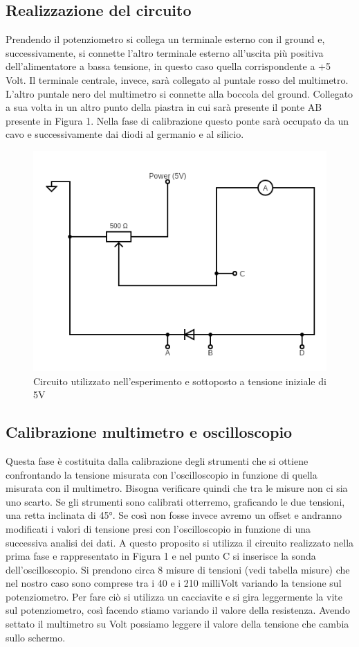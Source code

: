 \documentclass{article}
\begin{document}
\subsection{Realizzazione del circuito}
Prendendo il potenziometro si collega un terminale esterno con il ground e,  successivamente, si connette l’altro terminale esterno all’uscita più positiva dell’alimentatore a bassa tensione, in questo caso quella corrispondente a +5 Volt.
Il terminale centrale, invece, sarà collegato al puntale rosso del multimetro. L’altro puntale nero del multimetro si connette alla boccola del ground. Collegato a sua volta in un altro punto della piastra in cui sarà presente il ponte AB presente in Figura 1. Nella fase di calibrazione questo ponte sarà occupato da un cavo e successivamente dai diodi al germanio e al silicio.

\begin{figure}
\centering
\includegraphics[scale=0.50]{Circuit.png}
\caption{Circuito utilizzato nell'esperimento e sottoposto a tensione iniziale di 5V} 
\end{figure}
\subsection{Calibrazione multimetro e oscilloscopio}
Questa fase è costituita dalla calibrazione degli strumenti che si ottiene confrontando la tensione misurata con l’oscilloscopio in funzione di quella misurata con il multimetro. Bisogna verificare quindi che tra le misure non ci sia uno scarto. Se gli strumenti sono calibrati otterremo, graficando le due tensioni, una retta inclinata di 45°. Se così non fosse invece avremo un offset e andranno modificati i valori di tensione presi con l’oscilloscopio in funzione di una successiva analisi dei dati.
A questo proposito si utilizza il circuito realizzato nella prima fase e rappresentato in Figura 1 e nel punto C si inserisce la sonda dell’oscilloscopio.
Si prendono circa 8 misure di tensioni (vedi tabella misure) che nel nostro caso sono comprese tra i 40 e i 210 milliVolt variando la tensione sul potenziometro. Per fare ciò si utilizza un cacciavite e si gira leggermente la vite sul potenziometro, così facendo stiamo variando il valore della resistenza. Avendo settato il multimetro su Volt possiamo leggere il valore della tensione che cambia sullo schermo.
\end{document}
